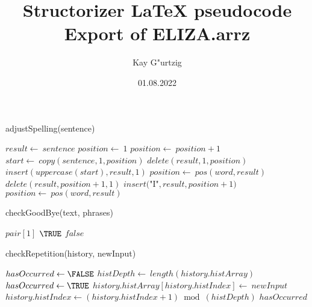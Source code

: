 \documentclass[a4paper,10pt]{article}
\title{Structorizer LaTeX pseudocode Export of ELIZA.arrz}
\author{Kay G"urtzig}
\date{01.08.2022}
\begin{document}
\begin{algorithm}
\caption{adjustSpelling(sentence)}
\begin{algorithmic}[5]

\STATE {}
  \STATE \(result\gets\ sentence\)
  \STATE \(position\gets\ 1\)
    \STATE \(position\gets\ position+1\)
  \ENDWHILE
    \STATE \(start\gets\ copy(sentence,1,position)\)
    \STATE \(delete(result,1,position)\)
    \STATE \(insert(uppercase(start),result,1)\)
  \ENDIF
    \STATE \(position\gets\ pos(word,result)\)
      \STATE \(delete(result,position+1,1)\)
      \STATE \(insert(\)"{}I"{}\(,result,position+1)\)
      \STATE \(position\gets\ pos(word,result)\)
    \ENDWHILE
  \ENDFOR

\end{algorithmic}
\end{algorithm}


\begin{algorithm}
\caption{checkGoodBye(text, phrases)}
\begin{algorithmic}[5]

\STATE {}
\STATE {}
\STATE {}
\STATE {}
      \PRINT\(pair[1]\)
      \RETURN\(\TRUE\)
    \ENDIF
  \ENDFOR
  \RETURN\(false\)

\end{algorithmic}
\end{algorithm}


\begin{algorithm}
\caption{checkRepetition(history, newInput)}
\begin{algorithmic}[5]

\STATE {}
\STATE {}
  \STATE \(hasOccurred\gets\FALSE\)
    \STATE \(histDepth\gets\ length(history.histArray)\)
        \STATE \(hasOccurred\gets\TRUE\)
      \ENDIF
    \ENDFOR
    \STATE \(history.histArray[history.histIndex]\gets\ newInput\)
    \STATE \(history.histIndex\gets(history.histIndex+1)\bmod(histDepth)\)
  \ENDIF
  \RETURN\(hasOccurred\)

\end{algorithmic}
\end{algorithm}
\end{document}
